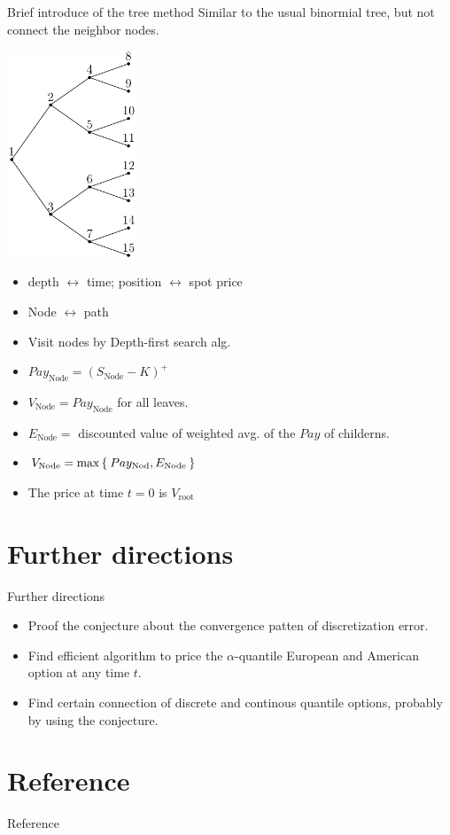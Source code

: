 \documentclass[cjk]{beamer}
\begin{document}
\begin{frame}{Brief introduce of the tree method}
Similar to the usual binormial tree, but not connect the neighbor nodes.

\includegraphics[width=0.29\textwidth]{bitree.pdf}
\parbox[b]{0.7\textwidth}{
\begin{itemize}
\item depth $\leftrightarrow$ time; position $\leftrightarrow$ spot price 
\item Node $\leftrightarrow$ path 
\item Visit nodes by Depth-first search alg.
\item $Pay_{\text{Node}} = (S_{\text{Node}}-K)^+$
\item $V_{\text{Node}} = Pay_{\text{Node}}$ for all leaves.
\item $E_{\text{Node}} =$ discounted value of weighted avg. of 
  the $Pay$ of childerns.
\item $V_{\text{Node}} = \max\Set{Pay_{\text{Nod}}, E_{\text{Node}}} $
\item The price at time $t=0$ is $V_{\text{root}}$
\end{itemize}
}
\end{frame}

\section{Further directions}
\begin{frame}{Further directions}
\begin{itemize}
\item Proof the conjecture about the convergence patten of discretization error. 
\item Find efficient algorithm to price 
  the $\alpha$-quantile European and American option at any time $t$. 
\item Find certain connection of discrete and continous quantile options, 
  probably by using the conjecture. 
\end{itemize}
\end{frame}

\section{Reference}
\begin{frame}[allowframebreaks]{Reference}


\end{frame}
\end{document}
